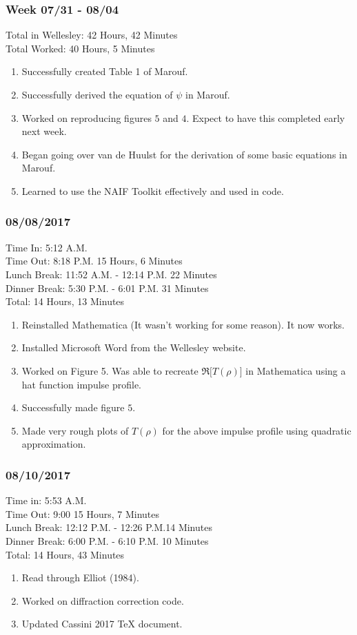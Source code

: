 \documentclass[crop=false,class=book]{standalone}
\begin{document}
\subsubsection{\footnotesize Week 07/31 - 08/04}
Total in Wellesley: \hfill 42 Hours, 42 Minutes\\
Total Worked: \hfill 40 Hours, 5 Minutes
\begin{enumerate}
    \item Successfully created Table 1 of Marouf. 
    \item Successfully derived the equation of $\psi$ in Marouf.
    \item Worked on reproducing figures $5$ and $4$. Expect to have this completed early next week.
    \item Began going over van de Huulst for the derivation of some basic equations in Marouf.
    \item Learned to use the NAIF Toolkit effectively and used in code.
\end{enumerate}
\subsubsection{\footnotesize 08/08/2017}
Time In: 5:12 A.M.\\
Time Out: 8:18 P.M. \hfill 15 Hours, 6 Minutes\\
Lunch Break: 11:52 A.M. - 12:14 P.M. \hfill 22 Minutes\\
Dinner Break: 5:30 P.M. - 6:01 P.M. \hfill 31 Minutes\\
Total: \hfill 14 Hours, 13 Minutes
\begin{enumerate}
    \item Reinstalled Mathematica (It wasn't working for some reason). It now works.
    \item Installed Microsoft Word from the Wellesley website.
    \item Worked on Figure 5. Was able to recreate $\Re\big[T(\rho)\big]$ in Mathematica using a hat function impulse profile.
    \item Successfully made figure $5$. 
    \item Made very rough plots of $T(\rho)$ for the above impulse profile using quadratic approximation.
\end{enumerate}
\subsubsection{\footnotesize 08/10/2017}
Time in: 5:53 A.M.\\
Time Out: 9:00 \hfill 15 Hours, 7 Minutes\\
Lunch Break: 12:12 P.M. - 12:26 P.M.\hfill 14 Minutes\\
Dinner Break: 6:00 P.M. - 6:10 P.M. \hfill 10 Minutes\\
Total: \hfill 14 Hours, 43 Minutes
\begin{enumerate}
    \item Read through Elliot (1984).
    \item Worked on diffraction correction code.
    \item Updated Cassini 2017 TeX document.
\end{enumerate}
\end{document}
